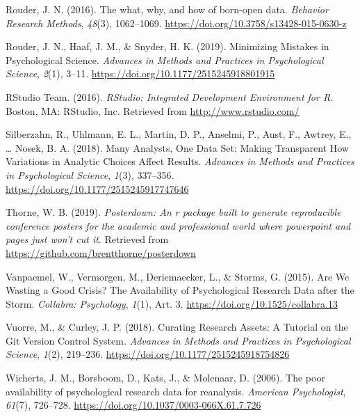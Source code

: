 \documentclass[
  english,
  jou,floatsintext]{apa6}
\newlength{\cslhangindent}
\newenvironment{cslreferences}%
  {\setlength{\parindent}{0pt}%
  \everypar{\setlength{\hangindent}{\cslhangindent}}\ignorespaces}%
  {\par}
\begin{document}
\begin{cslreferences}
\leavevmode\hypertarget{ref-Rouderwhatwhyhow2016}{}%
Rouder, J. N. (2016). The what, why, and how of born-open data. \emph{Behavior Research Methods}, \emph{48}(3), 1062--1069. \url{https://doi.org/10.3758/s13428-015-0630-z}

\leavevmode\hypertarget{ref-RouderMinimizingMistakesPsychological2019}{}%
Rouder, J. N., Haaf, J. M., \& Snyder, H. K. (2019). Minimizing Mistakes in Psychological Science. \emph{Advances in Methods and Practices in Psychological Science}, \emph{2}(1), 3--11. \url{https://doi.org/10.1177/2515245918801915}

\leavevmode\hypertarget{ref-RStudioTeamRStudioIntegratedDevelopment2016}{}%
RStudio Team. (2016). \emph{RStudio: Integrated Development Environment for R}. Boston, MA: RStudio, Inc. Retrieved from \url{http://www.rstudio.com/}

\leavevmode\hypertarget{ref-SilberzahnManyAnalystsOne2018}{}%
Silberzahn, R., Uhlmann, E. L., Martin, D. P., Anselmi, P., Aust, F., Awtrey, E., \ldots{} Nosek, B. A. (2018). Many Analysts, One Data Set: Making Transparent How Variations in Analytic Choices Affect Results. \emph{Advances in Methods and Practices in Psychological Science}, \emph{1}(3), 337--356. \url{https://doi.org/10.1177/2515245917747646}

\leavevmode\hypertarget{ref-R-posterdown}{}%
Thorne, W. B. (2019). \emph{Posterdown: An r package built to generate reproducible conference posters for the academic and professional world where powerpoint and pages just won't cut it}. Retrieved from \url{https://github.com/brentthorne/posterdown}

\leavevmode\hypertarget{ref-VanpaemelAreWeWasting2015}{}%
Vanpaemel, W., Vermorgen, M., Deriemaecker, L., \& Storms, G. (2015). Are We Wasting a Good Crisis? The Availability of Psychological Research Data after the Storm. \emph{Collabra: Psychology}, \emph{1}(1), Art. 3. \url{https://doi.org/10.1525/collabra.13}

\leavevmode\hypertarget{ref-VuorreCuratingResearchAssets2018}{}%
Vuorre, M., \& Curley, J. P. (2018). Curating Research Assets: A Tutorial on the Git Version Control System. \emph{Advances in Methods and Practices in Psychological Science}, \emph{1}(2), 219--236. \url{https://doi.org/10.1177/2515245918754826}

\leavevmode\hypertarget{ref-Wichertspooravailabilitypsychological2006}{}%
Wicherts, J. M., Borsboom, D., Kats, J., \& Molenaar, D. (2006). The poor availability of psychological research data for reanalysis. \emph{American Psychologist}, \emph{61}(7), 726--728. \url{https://doi.org/10.1037/0003-066X.61.7.726}


\end{cslreferences}
\end{document}
